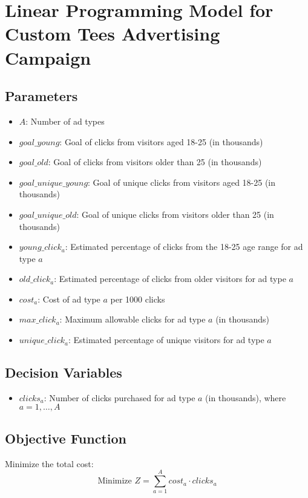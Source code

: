 \documentclass{article}
\begin{document}
\section*{Linear Programming Model for Custom Tees Advertising Campaign}

\subsection*{Parameters}
\begin{itemize}
    \item $A$: Number of ad types
    \item $goal\_young$: Goal of clicks from visitors aged 18-25 (in thousands)
    \item $goal\_old$: Goal of clicks from visitors older than 25 (in thousands)
    \item $goal\_unique\_young$: Goal of unique clicks from visitors aged 18-25 (in thousands)
    \item $goal\_unique\_old$: Goal of unique clicks from visitors older than 25 (in thousands)
    \item $young\_click_{a}$: Estimated percentage of clicks from the 18-25 age range for ad type $a$
    \item $old\_click_{a}$: Estimated percentage of clicks from older visitors for ad type $a$
    \item $cost_{a}$: Cost of ad type $a$ per 1000 clicks
    \item $max\_click_{a}$: Maximum allowable clicks for ad type $a$ (in thousands)
    \item $unique\_click_{a}$: Estimated percentage of unique visitors for ad type $a$
\end{itemize}

\subsection*{Decision Variables}
\begin{itemize}
    \item $clicks_{a}$: Number of clicks purchased for ad type $a$ (in thousands), where $a = 1, \dots, A$
\end{itemize}

\subsection*{Objective Function}
Minimize the total cost:
\[
\text{Minimize } Z = \sum_{a=1}^{A} cost_a \cdot clicks_a
\]
\end{document}
